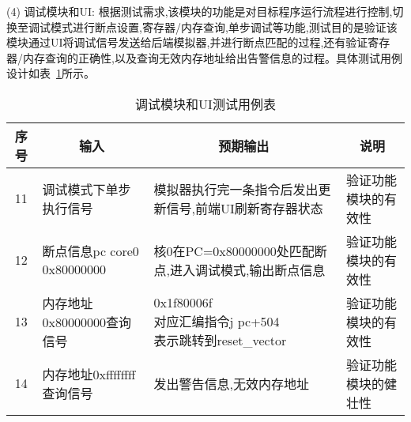 (4) 调试模块和UI: 根据测试需求,该模块的功能是对目标程序运行流程进行控制,切换至调试模式进行断点设置,寄存器/内存查询,单步调试等功能,测试目的是验证该模块通过UI将调试信号发送给后端模拟器,并进行断点匹配的过程,还有验证寄存器/内存查询的正确性,以及查询无效内存地址给出告警信息的过程。具体测试用例设计如表~\ref{tab:test4}所示。
\begin{table}[h]
    \centering
    \caption{调试模块和UI测试用例表}
    \label{tab:test4}
    \renewcommand\arraystretch{1.2}
    \begin{tabular}{clll}
      \toprule
      \multicolumn{1}{c}{序号} & \multicolumn{1}{c}{输入} & \multicolumn{1}{c}{预期输出} &\multicolumn{1}{c}{说明}\\
      \midrule
  11	& \multicolumn{1}{m{3cm}}{调试模式下单步执行信号} & \multicolumn{1}{m{4cm}}{模拟器执行完一条指令后发出更新信号,前端UI刷新寄存器状态} & \multicolumn{1}{m{3.5cm}}{验证功能模块的有效性}\\
  \hline
  12	& \multicolumn{1}{m{3cm}}{断点信息pc core0 0x80000000} & \multicolumn{1}{m{4cm}}{核0在PC=0x80000000处匹配断点,进入调试模式,输出断点信息} & \multicolumn{1}{m{3.5cm}}{验证功能模块的有效性}\\
  \hline
  13	& \multicolumn{1}{m{3cm}}{内存地址0x80000000查询信号} & \makecell[l]{0x1f80006f\\
  对应汇编指令j pc+504\\
  表示跳转到reset\_vector
  } & \multicolumn{1}{m{3.5cm}}{验证功能模块的有效性}\\
  \hline
  14	& \multicolumn{1}{m{3cm}}{内存地址0xffffffff查询信号} & \multicolumn{1}{m{4cm}}{发出警告信息,无效内存地址} & \multicolumn{1}{m{3.5cm}}{验证功能模块的健壮性}\\
      \bottomrule
    \end{tabular}
\end{table}

